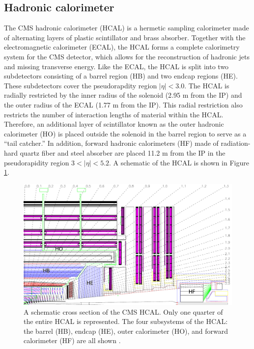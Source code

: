 \subsection{Hadronic calorimeter}
\label{sec:hcal}

The CMS hadronic calorimeter (HCAL) 
 is a hermetic sampling calorimeter 
made of alternating layers of plastic scintillator and brass absorber.
Together with the electromagnetic calorimeter (ECAL), the HCAL
forms a complete calorimetry system for the CMS detector, which
allows for the reconstruction of hadronic jets and missing transverse energy.
Like the ECAL, the HCAL is split into two subdetectors consisting 
of a barrel region (HB)
and two endcap regions (HE).
These subdetectors cover the pseudorapdity region $|\eta| < 3.0$.
The HCAL is radially restricted by the inner radius of the 
solenoid (2.95 m from the IP) and the outer radius of the ECAL
(1.77 m from the IP).  This radial restriction also restricts
the number of interaction lengths of material within the HCAL.
Therefore, an additional layer of scintillator known as the 
outer hadronic calorimeter (HO)
is placed outside 
the solenoid in the barrel region
to serve as a ``tail catcher.'' 
In addition, forward hadronic calorimeters (HF)
made of radiation-hard quartz fiber and steel absorber are
placed 11.2 m from the IP in the pseudorapidity
region $3 < |\eta| < 5.2$.
A schematic of the HCAL is shown in Figure \ref{fig:hcal}.

\begin{figure}
  \centering
  \includegraphics[width=1.0\textwidth]{tex/cms/fig/hcal-schematic.pdf}
  \caption{A schematic cross section of the CMS HCAL.  Only one quarter of the entire
    HCAL is represented. The four subsystems of the HCAL: the barrel (HB), endcap (HE),
    outer calorimeter (HO), and forward calorimeter (HF) are all shown \cite{cms-jinst}.}
  \label{fig:hcal}
\end{figure}


